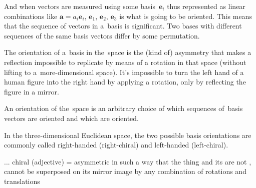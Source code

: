 And when vectors are measured using some basis~$\bm{e}_i$ thus represented as linear combinations like ${\bm{a} = a_i \bm{e}_i}$,   $\bm{e}_1$, $\bm{e}_2$, $\bm{e}_3$ is what is going to be oriented.
This means that the sequence of vectors in a~basis is significant.
Two bases with different sequences of the same basis vectors differ by some permutation.

{\small%
The orientation of a~basis in the~space is the (kind of) asymmetry that makes a reflection impossible to replicate by means of a rotation in that space (without lifting to a~more\hbox{-}dimensional space).
It’s impossible to turn the left hand of a human figure into the right hand by applying a rotation, only by reflecting the figure in a mirror.

An orientation of the~space is an arbitrary choice of which sequences of~basis vectors are  oriented and which are  oriented.

In the three-dimensional Euclidean space, the two possible basis orientations are commonly called right-handed (right-chiral) and left-handed (left-chiral).




... chiral (adjective) = asymmetric in such a way that the thing and its  are not , cannot be superposed on its mirror image by any combination of rotations and translations
\par}

